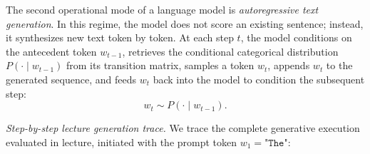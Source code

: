 \documentclass[../../main.tex]{subfiles}
\begin{document}
The second operational mode of a language model is \textit{autoregressive text generation}. In this regime, the model does not score an existing sentence; instead, it synthesizes new text token by token. At each step $t$, the model conditions on the antecedent token $w_{t-1}$, retrieves the conditional categorical distribution $P(\cdot \mid w_{t-1})$ from its transition matrix, samples a token $w_t$, appends $w_t$ to the generated sequence, and feeds $w_t$ back into the model to condition the subsequent step:
\begin{equation}
w_t \sim P\left(\cdot \mid w_{t-1}\right).
\end{equation}

\textit{Step-by-step lecture generation trace.} We trace the complete generative execution evaluated in lecture, initiated with the prompt token $w_1 = \texttt{"The"}$:
\end{document}
